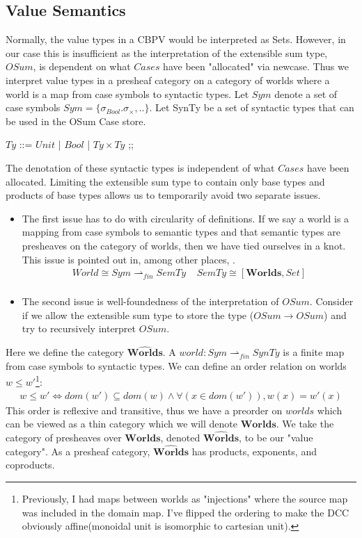 \documentclass{article}
\newcommand{\worlds}{\widehat{\mathbf{Worlds}}}
\begin{document}
\subsection{Value Semantics}
Normally, the value types in a CBPV would be interpreted as Sets. However, in our case this is insufficient as 
the interpretation of the extensible sum type, $OSum$, is dependent on what $Cases$ have been "allocated" via newcase. Thus we interpret value types in a presheaf category on a category of worlds where a world is a map from case symbols to syntactic types. Let $Sym$ denote a set of case symbols $Sym = \{\sigma_{Bool} . \sigma_{\times}, ..\}$. Let SynTy be a set of syntactic types that can be used in the OSum Case store.
\begin{bnfgrammar}
$Ty$ ::= $Unit$
| $Bool$
| $Ty \times Ty$
;;
\end{bnfgrammar}


The denotation of these syntactic types is independent of what $Cases$ have been allocated. Limiting the extensible sum type to contain only base types and products of base types allows us to temporarily avoid two separate issues. 
\begin{itemize}
    \item The first issue has to do with circularity of definitions. If we say a world is a mapping from case symbols to semantic types and that semantic types are presheaves on the category of worlds, then we have tied ourselves in a knot. This issue is pointed out in, among other places, \cite{sterling_denotational_2023}.
    \begin{align*}
        World \cong Sym \rightharpoonup_{fin} SemTy \;\;\;\; SemTy \cong [\mathbf{Worlds} , Set]\\
    \end{align*}
    
    \item The second issue is well-foundedness of the interpretation of $OSum$. Consider if we allow the extensible sum type to store the type ($OSum \rightarrow OSum$) and try to recursively interpret $OSum$.

\end{itemize}

 Here we define the category $\worlds$. A $world : Sym \rightharpoonup_{fin} SynTy$ is a finite map from case symbols to syntactic types. We can define an order relation on worlds $w \leq w'$\footnote{Previously, I had maps between worlds as "injections" where the source map was included in the domain map. I've flipped the ordering to make the DCC obviously affine(monoidal unit is isomorphic to cartesian unit).}:
 \begin{align*}
     w \leq w' \iff dom(w') \subseteq dom(w) \land \forall (x \in dom(w')), w(x) = w'(x)
 \end{align*}
  This order is reflexive and transitive, thus we have a preorder on $worlds$ which can be viewed as a thin category which we will denote $\mathbf{Worlds}$. We take the category of presheaves over $\mathbf{Worlds}$, denoted $\worlds$, to be our "value category". As a presheaf category, $\worlds$ has products, exponents, and coproducts. 
\end{document}
